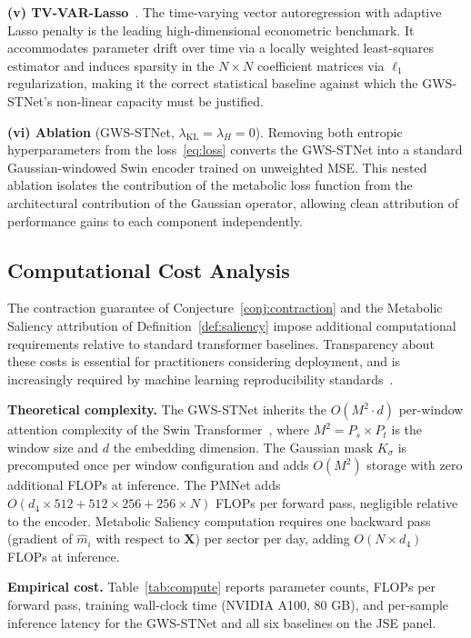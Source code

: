 \documentclass[11pt,a4paper]{article}  %
\theoremstyle{plain}
\theoremstyle{definition}
\theoremstyle{remark}
\begin{document}
\textbf{(v) TV-VAR-Lasso}~\cite{Kock2015}. The time-varying vector
autoregression with adaptive Lasso penalty is the leading
high-dimensional econometric benchmark. It accommodates parameter
drift over time via a locally weighted least-squares estimator and
induces sparsity in the $N\times N$ coefficient matrices via
$\ell_1$ regularization, making it the correct statistical baseline
against which the GWS-STNet's non-linear capacity must be
justified.

\textbf{(vi) Ablation} (GWS-STNet, $\lambda_{\mathrm{KL}} = \lambda_H = 0$).
Removing both entropic hyperparameters from the loss~\eqref{eq:loss}
converts the GWS-STNet into a standard Gaussian-windowed Swin
encoder trained on unweighted MSE. This nested ablation isolates
the contribution of the metabolic loss function from the architectural
contribution of the Gaussian operator, allowing clean attribution of
performance gains to each component independently.

\subsection{Computational Cost Analysis}
\label{subsec:complexity}

The contraction guarantee of Conjecture~\ref{conj:contraction}
and the Metabolic Saliency attribution of
Definition~\ref{def:saliency} impose additional computational
requirements relative to standard transformer baselines.
Transparency about these costs is essential for practitioners
considering deployment, and is increasingly required by
machine learning reproducibility standards~\cite{Pineau2021}.

\textbf{Theoretical complexity.} The GWS-STNet inherits the
$O(M^2 \cdot d)$ per-window attention complexity of the Swin
Transformer~\cite{Liu2021}, where $M^2 = P_s \times P_t$ is
the window size and $d$ the embedding dimension. The Gaussian
mask $K_\sigma$ is precomputed once per window configuration
and adds $O(M^2)$ storage with zero additional FLOPs at
inference. The PMNet adds $O(d_4 \times 512 + 512 \times 256
+ 256 \times N)$ FLOPs per forward pass, negligible relative
to the encoder. Metabolic Saliency computation requires one
backward pass (gradient of $\hat{m}_i$ with respect to
$\mathbf{X}$) per sector per day, adding $O(N \times d_4)$
FLOPs at inference.

\textbf{Empirical cost.} Table~\ref{tab:compute} reports
parameter counts, FLOPs per forward pass, training wall-clock
time (NVIDIA A100, 80 GB), and per-sample inference latency
for the GWS-STNet and all six baselines on the JSE panel.
\end{document}
